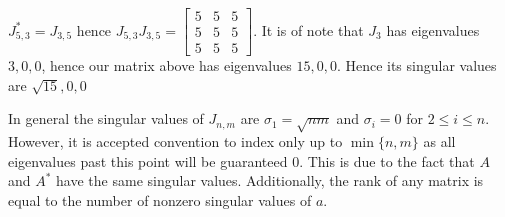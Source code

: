 \begin{example}
	\(J^{*}_{5, 3} = J_{3, 5}\) hence \(J_{5, 3} J_{3, 5} = \begin{bmatrix} 5&5&5\\
	5&5&5\\
5&5&5\end{bmatrix} \).
It is of note that \(J_{3}\) has eigenvalues \(3, 0, 0\), hence our matrix above has eigenvalues \(15, 0, 0\). Hence its singular values are \(\sqrt{15} , 0, 0\)
\end{example}
In general the singular values of \(J_{n, m}\) are \(\sigma_1 = \sqrt{nm} \) and \(\sigma_{i} = 0\) for \(2\le i \le n\). However, it is accepted convention to index only up to \(\min \{n, m\} \) as all eigenvalues past this point will be guaranteed \(0\). This is due to the fact that \(A\) and \(A^{*} \) have the same singular values. Additionally, the rank of any matrix  is equal to the number of nonzero singular values of \(a\).\\
